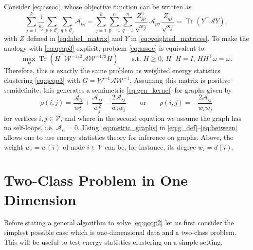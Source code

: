 \documentclass[aps,preprint,nofootinbib,floatfix]{revtex4-1}
\DeclareMathOperator{\Tr}{Tr}
\newcommand\C{{\mathcal{C}}}
\newcommand\om{\omega}
\begin{document}
Consider \eqref{eq:assoc}, whose objective function can be written as
\begin{equation}
\sum_{j=1}^k \dfrac{1}{s_j} \sum_{p \in \C_j} \sum_{q \in \C_j}
\mathcal{A}_{pq} = \sum_{j=1}^k \sum_{p=1}^n \sum_{q=1}^n 
\dfrac{Z^\top_{jp}}{\sqrt{s_j}} \, \mathcal{A}_{pq} \, 
\dfrac{Z_{qj}}{\sqrt{s_j}}
= \Tr\left( Y^\top \mathcal{A} Y \right) ,
\end{equation}
with $Z$ defined in \eqref{eq:label_matrix} and $Y$ in
\eqref{eq:weighted_matrices}. To make the analogy with \eqref{eq:qcqp3}
explicit,  problem \eqref{eq:assoc} is equivalent to
\begin{equation}
\max_H \Tr\left( H^\top \mathcal{W}^{-1/2} \mathcal{A} \mathcal{W}^{-1/2} H 
\right) \qquad \mbox{s.t. $H\ge 0$, $H^\top H = I$, $H H^\top
\om=\om$}.
\end{equation}
Therefore, this is exactly the same problem as weighted energy statistics
clustering \eqref{eq:qcqp3} with 
$G = \mathcal{W}^{-1} \mathcal{A} \mathcal{W}^{-1}$. Assuming this
matrix is positive semidefinite, this generates a semimetric
\eqref{eq:gen_kernel} for graphs given by
\begin{equation}
\label{eq:metric_graphs}
\rho(i,j) = 
\dfrac{\mathcal{A}_{ii}}{w_i^{2}}
+\dfrac{\mathcal{A}_{jj}}{w_j^{2}}
-\dfrac{2 \mathcal{A}_{ij}}{w_i w_j} \qquad\mbox{or}\qquad
\rho(i,j) = -\dfrac{2 \mathcal{A}_{ij}}{w_i w_j}
\end{equation}
for vertices $i,j \in \mathcal{V}$, and 
where in the second equation we assume the graph has no self-loops,
i.e. $\mathcal{A}_{ii} = 0$. Using \eqref{eq:metric_graphs} 
in \eqref{eq:g_def}--\eqref{eq:between}
allows one to use energy statistics theory for inference
on graphs.
Above, the weight $w_i = w(i)$ of node $i\in \mathcal{V}$ can be, for instance,
its degree $w_i = d(i)$.


\section{Two-Class Problem in One Dimension}
\label{sec:twoclass}

Before stating a general algorithm to solve \eqref{eq:qcqp2} 
let us first consider the simplest possible case which
is one-dimensional data and a two-class problem. This will be useful to test
energy statistics clustering on a simple setting.
\end{document}
